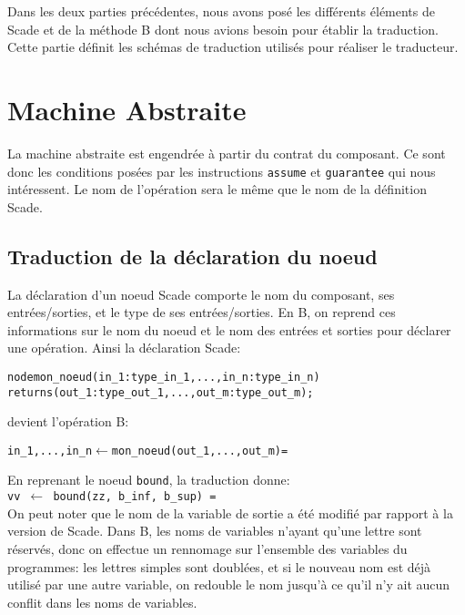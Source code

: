 


Dans les deux parties précédentes, nous avons posé les différents
éléments de Scade et de la méthode B dont nous avions besoin pour
établir la traduction. Cette partie définit les schémas de traduction
utilisés pour réaliser le traducteur. \\

\section{Machine Abstraite}

La machine abstraite est engendrée à partir du contrat du composant. Ce sont
donc les conditions posées par les instructions \texttt{assume} et
\texttt{guarantee} qui nous intéressent. Le nom de l'opération sera le même que le
nom de la définition Scade. 

\subsection{Traduction de la déclaration du noeud}
La déclaration d'un noeud Scade comporte le nom du composant, ses
entrées/sorties, et le type de ses entrées/sorties. En B, on reprend ces
informations sur le nom du noeud et le nom des entrées et sorties pour déclarer une
opération. Ainsi la déclaration Scade: 
\begin{alltt}
node mon\_noeud (in_1: type\_in_1, ..., in_n: type\_in_n) 
                returns (out_1: type\_out_1, ..., out_m: type\_out_m);
\end{alltt}
devient l'opération B:
\begin{alltt}
in_1, ..., in_n \(\leftarrow\) mon\_noeud(out_1, ..., out_m) =
\end{alltt}

\noindent
En reprenant le noeud \texttt{bound}, la traduction donne:\\
\texttt{vv $\leftarrow$ bound(zz, b\_inf, b\_sup) =}\\
On peut noter que le nom de la variable de sortie a été
modifié par rapport à la version de Scade. Dans B, les noms de variables n'ayant qu'une lettre sont
réservés, donc on effectue un rennomage sur l'ensemble des variables
du programmes: les lettres simples sont doublées, et si le nouveau nom
est déjà utilisé par une autre variable, on redouble le nom jusqu'à ce
qu'il n'y ait aucun conflit dans les noms de variables.

